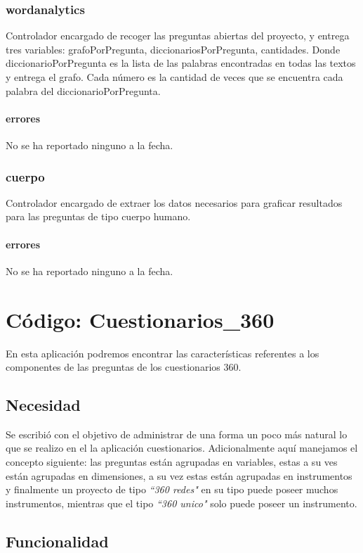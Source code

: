 \documentclass[10pt,a4paper]{book}
\begin{document}
	\subsection{wordanalytics}
	Controlador encargado de recoger las preguntas abiertas del proyecto, y entrega tres variables: grafoPorPregunta, diccionariosPorPregunta, cantidades. Donde diccionarioPorPregunta es la lista de las palabras encontradas en todas las textos y entrega el grafo. Cada número es la cantidad de veces que se encuentra cada palabra del diccionarioPorPregunta.
	\subsubsection{errores}
	No se ha reportado ninguno a la fecha.
	
	\subsection{cuerpo}
	Controlador encargado de extraer los datos necesarios para graficar resultados para las preguntas de tipo cuerpo humano. 
	\subsubsection{errores}
	No se ha reportado ninguno a la fecha.


	\chapter{Código: Cuestionarios\_360}
	
	En esta aplicación podremos encontrar las características referentes a los componentes de las preguntas de los cuestionarios 360.
	
	\section{Necesidad}
	
	Se escribió con el objetivo de administrar de una forma un poco más natural lo que se realizo en el la aplicación cuestionarios. Adicionalmente aquí manejamos el concepto siguiente: las preguntas están agrupadas en variables, estas a su ves están agrupadas en dimensiones, a su vez estas están agrupadas en instrumentos y finalmente un proyecto de tipo \textit{``360 redes"} en su tipo puede poseer muchos instrumentos, mientras que el tipo \textit{``360 unico"} solo puede poseer un instrumento.
	
	\section{Funcionalidad}
\end{document}
